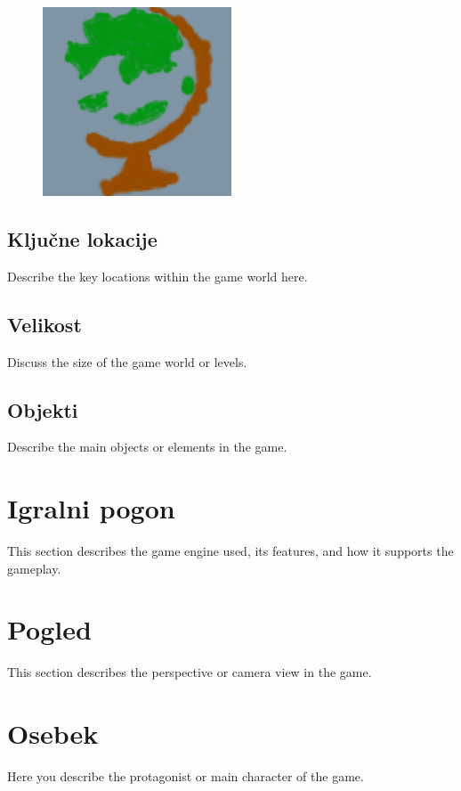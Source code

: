 \documentclass[a4paper,12pt]{article}
\begin{document}
\begin{figure}[h!]
    \centering
    \includegraphics[width=0.5\textwidth]{./slika.png}
\end{figure}

\subsection{Ključne lokacije}
\noindent Describe the key locations within the game world here.

\subsection{Velikost}
\noindent Discuss the size of the game world or levels.

\subsection{Objekti}
\noindent Describe the main objects or elements in the game.

\newpage

\section{Igralni pogon}
\noindent This section describes the game engine used, its features, and how it supports the gameplay.

\newpage

\section{Pogled}
\noindent This section describes the perspective or camera view in the game.

\newpage

\section{Osebek}
\noindent Here you describe the protagonist or main character of the game.
\end{document}
